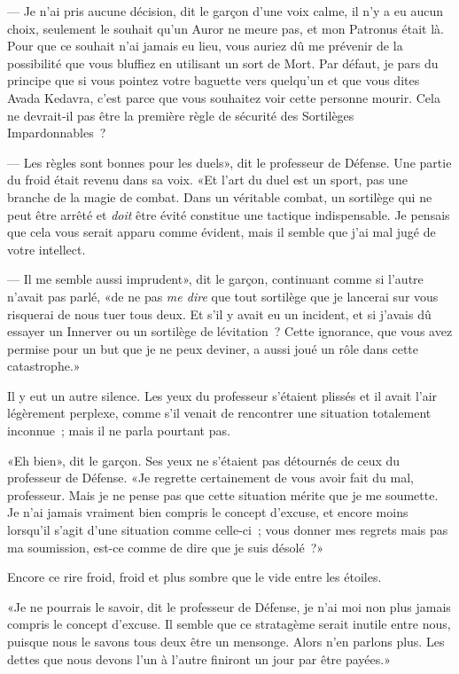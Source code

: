 --- Je n'ai pris aucune décision, dit le garçon d'une voix calme, il n'y a eu aucun choix, seulement le souhait qu'un Auror ne meure pas, et mon Patronus était là. Pour que ce souhait n'ai jamais eu lieu, vous auriez dû me prévenir de la possibilité que vous bluffiez en utilisant un sort de Mort. Par défaut, je pars du principe que si vous pointez votre baguette vers quelqu'un et que vous dites Avada Kedavra, c'est parce que vous souhaitez voir cette personne mourir. Cela ne devrait-il pas être la première règle de sécurité des Sortilèges Impardonnables~?

--- Les règles sont bonnes pour les duels», dit le professeur de Défense. Une partie du froid était revenu dans sa voix. «Et l'art du duel est un sport, pas une branche de la magie de combat. Dans un véritable combat, un sortilège qui ne peut être arrêté et \emph{doit} être évité constitue une tactique indispensable. Je pensais que cela vous serait apparu comme évident, mais il semble que j'ai mal jugé de votre intellect.

--- Il me semble aussi imprudent», dit le garçon, continuant comme si l'autre n'avait pas parlé, «de ne pas \emph{me dire} que tout sortilège que je lancerai sur vous risquerai de nous tuer tous deux. Et s'il y avait eu un incident, et si j'avais dû essayer un Innerver ou un sortilège de lévitation~? Cette ignorance, que vous avez permise pour un but que je ne peux deviner, a aussi joué un rôle dans cette catastrophe.»

Il y eut un autre silence. Les yeux du professeur s'étaient plissés et il avait l'air légèrement perplexe, comme s'il venait de rencontrer une situation totalement inconnue~; mais il ne parla pourtant pas.

«Eh bien», dit le garçon. Ses yeux ne s'étaient pas détournés de ceux du professeur de Défense. «Je regrette certainement de vous avoir fait du mal, professeur. Mais je ne pense pas que cette situation mérite que je me soumette. Je n'ai jamais vraiment bien compris le concept d'excuse, et encore moins lorsqu'il s'agit d'une situation comme celle-ci~; vous donner mes regrets mais pas ma soumission, est-ce comme de dire que je suis désolé~?»

Encore ce rire froid, froid et plus sombre que le vide entre les étoiles.

«Je ne pourrais le savoir, dit le professeur de Défense, je n'ai moi non plus jamais compris le concept d'excuse. Il semble que ce stratagème serait inutile entre nous, puisque nous le savons tous deux être un mensonge. Alors n'en parlons plus. Les dettes que nous devons l'un à l'autre finiront un jour par être payées.»

